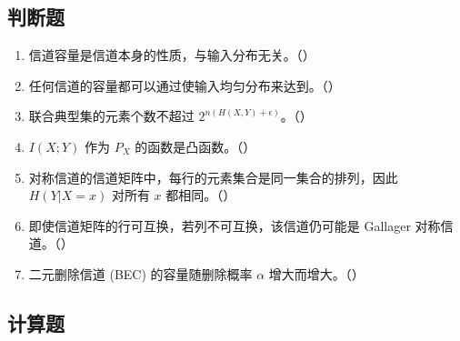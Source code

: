\documentclass[12pt,a4paper]{ctexart}
\begin{document}
\subsection*{判断题}

\begin{enumerate}[label=\arabic*., leftmargin=*]
\item 信道容量是信道本身的性质，与输入分布无关。（\quad）
\item 任何信道的容量都可以通过使输入均匀分布来达到。（\quad）
\item 联合典型集的元素个数不超过 $2^{n(H(X,Y)+\epsilon)}$。（\quad）
\item $I(X;Y)$ 作为 $P_X$ 的函数是凸函数。（\quad）
\item 对称信道的信道矩阵中，每行的元素集合是同一集合的排列，因此 $H(Y|X=x)$ 对所有 $x$ 都相同。（\quad）
\item 即使信道矩阵的行可互换，若列不可互换，该信道仍可能是 Gallager 对称信道。（\quad）
\item 二元删除信道 (BEC) 的容量随删除概率 $\alpha$ 增大而增大。（\quad）
\end{enumerate}

\subsection*{计算题}
\end{document}
